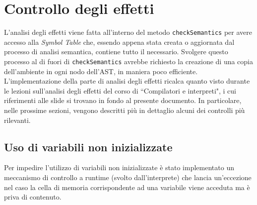 \documentclass[../report.tex]{subfiles}
\begin{document}
\section{Controllo degli effetti}\label{s:controllo-effetti}
L'analisi degli effetti viene fatta all'interno del metodo \verb|checkSemantics| per avere accesso alla \textit{Symbol Table} che, essendo appena stata creata o aggiornata dal processo di analisi semantica, contiene tutto il necessario.
Svolgere questo processo al di fuori di \verb|checkSemantics| avrebbe richiesto la creazione di una copia dell'ambiente in ogni nodo dell'AST, in maniera poco efficiente.\\
\noindent
L'implementazione della parte di analisi degli effetti ricalca quanto visto durante le lezioni sull'analisi degli effetti del corso di ``Compilatori e interpreti", i cui riferimenti alle slide si trovano in fondo al presente documento.
In particolare, nelle prossime sezioni, vengono descritti più in dettaglio alcuni dei controlli più rilevanti.

\subsection{Uso di variabili non inizializzate}\label{s:uso-variabili-non-inizializzate}
Per impedire l'utilizzo di variabili non inizializzate è stato implementato un meccanismo di controllo a runtime (svolto dall'interprete) che lancia un'eccezione nel caso la cella di memoria corrispondente ad una variabile viene acceduta ma è priva di contenuto.
\end{document}
